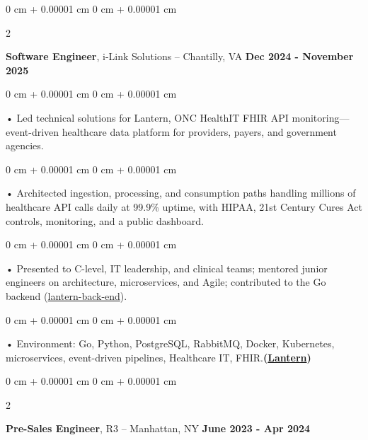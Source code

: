 \documentclass[10pt, letterpaper]{article}
\newenvironment{onecolentry}{
    \begin{adjustwidth}{
        0 cm + 0.00001 cm
    }{
        0 cm + 0.00001 cm
    }
}{
    \end{adjustwidth}
} %
\newenvironment{twocolentry}[2][]{
    \onecolentry
    \def\secondColumn{#2}
    \setcolumnwidth{\fill, 4.5 cm}
    \begin{paracol}{2}
}{
    \switchcolumn \raggedleft \secondColumn
    \end{paracol}
    \endonecolentry
} %
\begin{document}
        \vspace{0.1cm}

        \begin{twocolentry}{
            \textbf{Dec 2024 - November 2025}
        }
            \textbf{Software Engineer}, i-Link Solutions -- Chantilly, VA\end{twocolentry}


        \begin{onecolentry}
             • Led technical solutions for Lantern, ONC HealthIT FHIR API monitoring---event-driven healthcare data platform for providers, payers, and government agencies.
        \end{onecolentry}
        \begin{onecolentry}
             • Architected ingestion, processing, and consumption paths handling millions of healthcare API calls daily at 99.9\% uptime, with HIPAA, 21st Century Cures Act controls, monitoring, and a public dashboard.
        \end{onecolentry}
        \begin{onecolentry}
             • Presented to C-level, IT leadership, and clinical teams; mentored junior engineers on architecture, microservices, and Agile; contributed to the Go backend (\href{https://github.com/onc-healthit/lantern-back-end}{lantern-back-end}).
        \end{onecolentry}

        \begin{onecolentry}
             • Environment: Go, Python, PostgreSQL, RabbitMQ, Docker, Kubernetes, microservices, event-driven pipelines, Healthcare IT, FHIR.\textbf{(\href{https://lantern.healthit.gov/?tab=dashboard_tab}{Lantern})}
        \end{onecolentry}
        \vspace{0.1cm}

        \begin{twocolentry}{
            \textbf{June 2023 - Apr 2024}
        }
            \textbf{Pre-Sales Engineer}, R3 -- Manhattan, NY\end{twocolentry}
\end{document}
